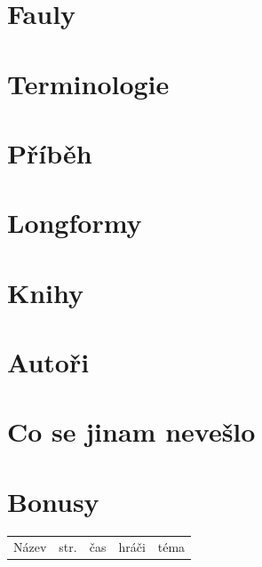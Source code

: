 \documentclass[a4paper,10pt,openany]{book}
\begin{document}
\chapter{Fauly}\label{fauly}

\label{:kategorie:fauly}
 
 

\chapter{Terminologie}\label{terminologie}
\label{:kategorie:terminologie}


\chapter{Příběh}




\chapter{Longformy}\label{longformy}




\chapter{Knihy}\label{knihy}



\chapter{Autoři}\label{autori}


\chapter{Co se jinam nevešlo}\label{co se jinam nevešlo}


\chapter{Bonusy}
\pagebreak
\newcommand{\btbinfo}[6]{

\ifx Z#6 \textbf{#1} \else #1 \small{  (i)} \fi   & \pageref{#2} &  \small{#3} & \small{#4} & \small{#5}\hline
}
\begin{longtable}{|p{4cm}|p{.4cm}|p{3.2cm}|p{3cm}|p{4.2cm}|}
\hline 
Název&str.&čas&hráči&téma \hline 


\end{longtable}
\pagebreak
\renewcommand{\btbinfo}[6]{
\ifx Z#6 \large{#1}   \fi

} 
\end{document}
